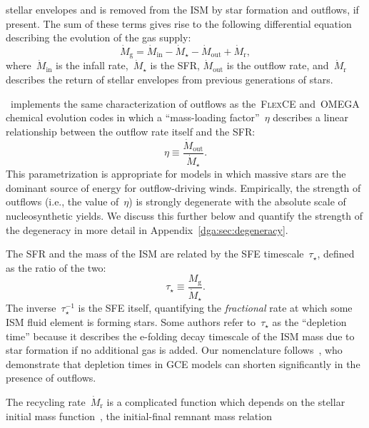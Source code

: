 stellar envelopes and is removed from the ISM by star formation and outflows,
if present.
The sum of these terms gives rise to the following differential equation
describing the evolution of the gas supply:
\begin{equation}
\dot{M}_\text{g} = \dot{M}_\text{in} - \dot{M}_\star - \dot{M}_\text{out}
+ \dot{M}_\text{r},
\label{dga:eq:mdotgas}
\end{equation}
where~$\dot{M}_\text{in}$ is the infall rate,~$\dot{M}_\star$ is the SFR,
$\dot{M}_\text{out}$ is the outflow rate, and~$\dot{M}_\text{r}$ describes
the return of stellar envelopes from previous generations of stars.
\par
\vice~implements the same characterization of outflows as the~\textsc{FlexCE}
\citep{Andrews2017} and~\textsc{OMEGA}~\citep{Cote2017} chemical evolution
codes in which a ``mass-loading factor''~$\eta$ describes a linear relationship
between the outflow rate itself and the SFR:
\begin{equation}
\eta \equiv \frac{\dot{M}_\text{out}}{\dot{M}_\star}.
\label{dga:eq:massloading}
\end{equation}
This parametrization is appropriate for models in which massive stars are the
dominant source of energy for outflow-driving winds.
Empirically, the strength of outflows (i.e., the value of~$\eta$) is strongly
degenerate with the absolute scale of nucleosynthetic yields.
We discuss this further below and quantify the strength of the degeneracy in
more detail in Appendix~\ref{dga:sec:degeneracy}.
\par
The SFR and the mass of the ISM are related by the SFE timescale~$\tau_\star$,
defined as the ratio of the two:
\begin{equation}
\tau_\star \equiv \frac{M_\text{g}}{\dot{M}_\star}.
\label{dga:eq:taustar}
\end{equation}
The inverse~$\tau_\star^{-1}$ is the SFE itself, quantifying the
\textit{fractional} rate at which some ISM fluid element is forming stars.
Some authors refer to~$\tau_\star$ as the ``depletion time''
\citep[e.g.,][]{Tacconi2018} because it describes the e-folding decay timescale
of the ISM mass due to star formation if no additional gas is added.
Our nomenclature follows~\citet{Weinberg2017b}, who demonstrate that depletion
times in GCE models can shorten significantly in the presence of outflows.
\par
The recycling rate~$\dot{M}_\text{r}$ is a complicated function which depends
on the stellar initial mass function~\citep[IMF; e.g.,][]{Salpeter1955,
Miller1979, Kroupa2001, Chabrier2003}, the initial-final remnant mass relation
